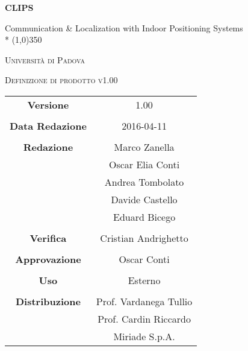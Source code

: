 \documentclass[a4paper,12pt]{article}
\author{}
\date{03/03/2016}
\begin{document}
\begin{titlepage}
	\centering
	{\huge\bfseries CLIPS\par}
	Communication \& Localization with Indoor Positioning Systems \\*
	\line(1,0){350} \\
	{\scshape\LARGE Università di Padova \par}
	\vspace{1cm}
	{\scshape\Large Definizione di prodotto v1.00\par}
	\logo
	\newpage
		\begin{tabular}{c|c}
			{\hfill \textbf{Versione}} 			& 1.00				\\ \\
			{\hfill\textbf{Data Redazione}} 	& 2016-04-11	\\ \\
			{\hfill\textbf{Redazione}} 			& Marco Zanella \\
												& Oscar Elia Conti \\
												& Andrea Tombolato \\
												& Davide Castello \\
												& Eduard Bicego 	\\ \\
			{\hfill\textbf{Verifica}} 			& Cristian Andrighetto \\ \\
			{\hfill\textbf{Approvazione}} 		& Oscar Conti		\\ \\
			{\hfill\textbf{Uso}} 				& Esterno			\\ \\
			{\hfill\textbf{Distribuzione}} 		& Prof. Vardanega Tullio \\
												& Prof. Cardin Riccardo \\
												& Miriade S.p.A. \\
		\end{tabular}
	\end{titlepage}
	
	\newpage
	\pagestyle{myfront}
		
	\newpage
		\tableofcontents
	\newpage
		\listoffigures	
	\label{LastFrontPage}
	\newpage
	
	\pagestyle{mymain}
	
	\newpage
		
		
	\newpage
		
		
	\newpage
			
		
	\newpage
		
		
	\newpage
		
		
	\newpage
		
		
		
	\label{LastPage}
\end{document}
